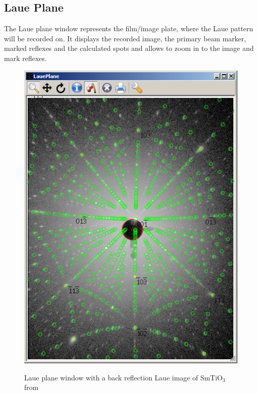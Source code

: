\subsection{Laue Plane}

The Laue plane window represents the film/image plate, where the Laue
pattern will be recorded on. It displays the recorded image, the
primary beam marker, marked reflexes and the calculated spots and
allows to zoom in to the image and mark reflexes.


\begin{figure}[htb]
  \centering
  \begin{minipage}[b]{0.4\textwidth}
    \includegraphics[width=\textwidth]{clip/Tool_LauePlane}
    \label{Clip:FigToolLauePlane}
    \caption[Laue plane window]{Laue plane window with a back reflection Laue image of
      SmTiO$_3$ from \cite{RothDiss}}
  \end{minipage}
  \imgspace{}
  \begin{minipage}[b]{0.4\textwidth}

\end{minipage}
\end{figure}
